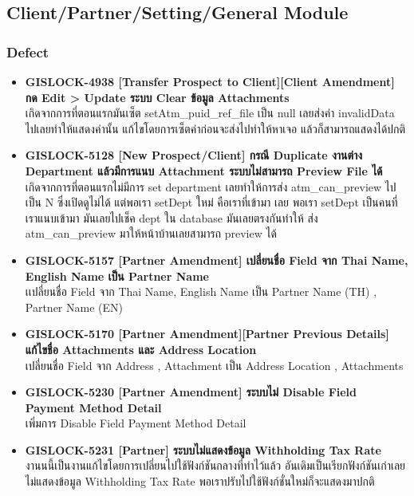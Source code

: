 \subsection{Client/Partner/Setting/General Module}

\subsubsection{Defect}
\begin{itemize}
    \setlength\itemsep{1em}
    \item \textbf{{GISLOCK-4938 [Transfer Prospect to Client][Client Amendment] กด Edit > Update ระบบ Clear ข้อมูล Attachments}} \\
          เกิดจากการที่ตอนแรกมันเซ็ต setAtm\_puid\_ref\_file เป็น null เลยส่งค่า invalidData ไปเลยทำให้แสดงค่านั้น แก้ไขโดยการเซ็ตค่าก่อนจะส่งไปทำให้หาเจอ แล้วก็สามารถแสดงได้ปกติ      
    \item \textbf{{GISLOCK-5128 [New Prospect/Client] กรณี Duplicate งานต่าง Department แล้วมีการแนบ Attachment ระบบไม่สามารถ Preview File ได้}} \\
          เกิดจากการที่ตอนแรกไม่มีการ set department เลยทำให้การส่ง atm\_can\_preview ไปเป็น N ซึ่งเปิดดูไม่ได้ แต่พอเรา setDept ใหม่ คือเราที่เข้ามา เลย พอเรา setDept เป็นคนที่เราแนบเข้ามา มันเลยไปเช็ค dept ใน database มันเลยตรงกันทำให้ ส่ง atm\_can\_preview มาให้หน้าบ้านเลยสามารถ preview ได้
    \item \textbf{{GISLOCK-5157 [Partner Amendment] เปลี่ยนชื่อ Field จาก Thai Name, English Name เป็น Partner Name}} \\
          เเปลี่ยนชื่อ Field จาก Thai Name, English Name เป็น Partner Name (TH) , Partner Name (EN)
    \item \textbf{{GISLOCK-5170 [Partner Amendment][Partner Previous Details] แก้ไขชื่อ Attachments และ Address Location}} \\
          เปลี่ยนชื่อ Field จาก Address , Attachment เป็น Address Location , Attachments
    \item \textbf{{GISLOCK-5230 [Partner Amendment] ระบบไม่ Disable Field Payment Method Detail}} \\
          เพิ่มการ Disable Field Payment Method Detail
    \item \textbf{{GISLOCK-5231 [Partner] ระบบไม่แสดงข้อมูล Withholding Tax Rate}} \\
          งานนนี้เป็นงานแก้ไขโดยการเปลี่ยนไปใช้ฟังก์ชันกลางที่ทำไว้แล้ว อันเดิมเป็นเรียกฟังก์ชันเก่าเลยไม่แสดงข้อมูล Withholding Tax Rate พอเราปรับไปใช้ฟังก์ชั่นใหม่ก็จะแสดงมาปกติ     

\end{itemize}
